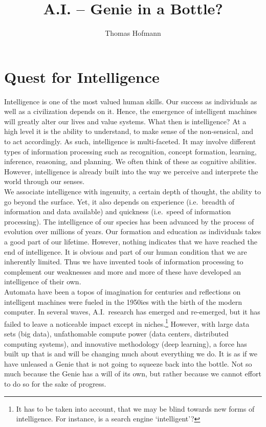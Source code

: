 \documentclass[a4]{article}
\author{Thomas Hofmann}
\title{A.I. -- Genie in a Bottle?}
\begin{document}
\maketitle

\section{Quest for Intelligence}

Intelligence is one of the most valued human skills. Our success as individuals as well as a civilization depends on it. Hence, the emergence of intelligent machines will greatly alter our lives and value systems. What then is intelligence? At a high level it is  the ability to understand, to make sense of the non-sensical, and to act accordingly. As such, intelligence is multi-faceted. It may involve different types of information processing such as recognition, concept formation, learning, inference, reasoning, and planning. We often think of these as cognitive abilities. However, intelligence is already built into the way we perceive and interprete the world through our senses. \\

\noindent We associate intelligence with ingenuity, a certain depth of thought, the ability to go beyond the surface. Yet, it also depends on experience (i.e.~breadth of information and data available) and quickness (i.e.~speed of information processing). The intelligence of our species has been advanced by the process of evolution over millions of years. Our formation and education as individuals takes a good part of our lifetime. However, nothing indicates that we have reached the end of intelligence. It is obvious and part of our human condition that we are inherently limited. Thus we have invented tools of information processing to complement our weaknesses and more and more of these have developed an intelligence of their own.\\

\noindent Automata have been a topos of imagination for centuries and reflections on intelligent machines were fueled in the 1950ies with the birth of the modern computer. In several waves, A.I.~research has emerged and re-emerged, but it has failed to leave a noticeable impact except in niches.\footnote{It has to be taken into account, that we may be blind towards new forms of intelligence. For instance, is a search engine `intelligent'?}  However, with large data sets (big data), unfathomable compute power (data centers, distributed computing systems), and innovative methodology (deep learning), a force has built up that is and will be changing much about everything we do. It is as if we have unleased a Genie that is not going to squeeze back into the bottle. Not so much because the Genie has a will of its own, but rather because we cannot effort to do so for the sake of progress.\\
\end{document}

